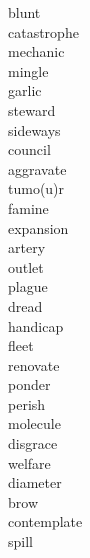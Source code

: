 \documentclass[a4paper, 11pt]{ctexart}
\begin{document}
\begin{multicols*}{3}
\begin{description}
\item[blunt]

\item[catastrophe]

\item[mechanic]

\item[mingle]

\item[garlic]

\item[steward]

\item[sideways]

\item[council]

\item[aggravate]

\item[tumo(u)r]

\item[famine]

\item[expansion]

\item[artery]

\item[outlet]

\item[plague]

\item[dread]

\item[handicap]

\item[fleet]

\item[renovate]

\item[ponder]

\item[perish]

\item[molecule]

\item[disgrace]

\item[welfare]

\item[diameter]

\item[brow]

\item[contemplate]

\item[spill]


\end{description}
\end{multicols*}
\end{document}
